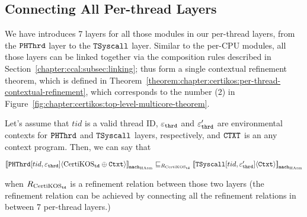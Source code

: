 \subsection{Connecting All Per-thread Layers}
\label{chapter:certikos:subsec:connecting-all-thread-layers}

We have introduces 7 layers for all those modules in our per-thread layers, from the ${\mathrm{\texttt{PHThrd}}}$ layer to the 
${\mathrm{\texttt{TSyscall}}}$ layer.
Similar to the per-CPU modules, all those layers can be linked together via the composition rules described in Section~\ref{chapter:ccal:subsec:linking};
thus form a single contextual refinement theorem, which is defined in Theorem~\ref{theorem:chapter:certikos:per-thread-contextual-refinement},
which corresponds to the number (2) in Figure~\ref{fig:chapter:certikos:top-level-multicore-theorem}.
\begin{theorem}
\label{theorem:chapter:certikos:per-thread-contextual-refinement}
Let's assume that $tid$ is a valid thread ID, ${\varepsilon}_{{\mathrm{\texttt{thrd}}}}$ and  ${\varepsilon}'_{{\mathrm{\texttt{thrd}}}}$ are environmental contexts for 
${\mathrm{\texttt{PHThrd}}}$  and ${\mathrm{\texttt{TSyscall}}}$ layers, respectively, and ${\mathrm{\texttt{CTXT}}}$ is an any context program. Then, we can say that
\begin{center}
${[\![{{\mathrm{\texttt{PHThrd}}}[tid, {\varepsilon}_{{\mathrm{\texttt{thrd}}}}]} \langle {\mathrm{CertiKOS}_{{\mathrm{\texttt{td}}}} \oplus {\mathrm{\texttt{Ctxt}}}} \rangle]\!]}_{{\mathrm{\texttt{mach}}}_{\mathrm{HAsm}}} \sqsubseteq_{R_{\mathrm{CertiKOS}_{\mathrm{\texttt{td}}}}} {[\![{{\mathrm{\texttt{TSyscall}}}[tid, {\varepsilon}'_{{\mathrm{\texttt{thrd}}}}]} \langle {{\mathrm{\texttt{Ctxt}}}} \rangle]\!]}_{{{\mathrm{\texttt{mach}}}_{\mathrm{HAsm}}}}$
\end{center}
when ${R_{\mathrm{CertiKOS}_{\mathrm{\texttt{td}}}}}$ is a refinement relation between those two layers (the refinement relation can be achieved by 
connecting all the refinement relations in between 7 per-thread layers.)
\end{theorem}


